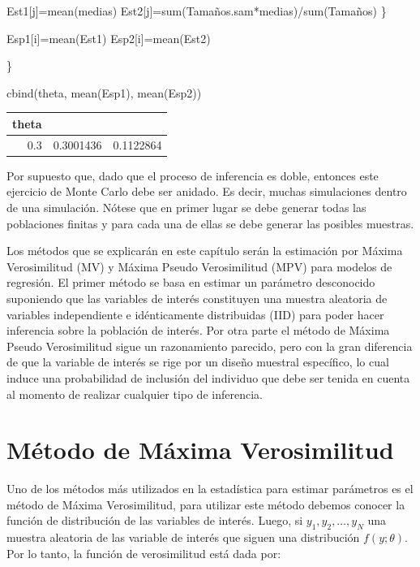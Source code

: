 \documentclass[
  12pt,
]{book}
\newenvironment{Shaded}{\begin{snugshade}}{\end{snugshade}}
\newcommand{\FunctionTok}[1]{\textcolor[rgb]{0.00,0.00,0.00}{#1}}
\newcommand{\NormalTok}[1]{#1}
\newcommand{\OtherTok}[1]{\textcolor[rgb]{0.56,0.35,0.01}{#1}}
\newcommand{\SpecialCharTok}[1]{\textcolor[rgb]{0.00,0.00,0.00}{#1}}
\begin{document}
\begin{Shaded}
\begin{Highlighting}[]
\NormalTok{Est1[j]}\OtherTok{=}\FunctionTok{mean}\NormalTok{(medias)}
\NormalTok{Est2[j]}\OtherTok{=}\FunctionTok{sum}\NormalTok{(Tamaños.sam}\SpecialCharTok{*}\NormalTok{medias)}\SpecialCharTok{/}\FunctionTok{sum}\NormalTok{(Tamaños)}
\NormalTok{\}}

\NormalTok{Esp1[i]}\OtherTok{=}\FunctionTok{mean}\NormalTok{(Est1)}
\NormalTok{Esp2[i]}\OtherTok{=}\FunctionTok{mean}\NormalTok{(Est2)}

\NormalTok{\}}

\FunctionTok{cbind}\NormalTok{(theta, }\FunctionTok{mean}\NormalTok{(Esp1), }\FunctionTok{mean}\NormalTok{(Esp2))}
\end{Highlighting}
\end{Shaded}

\begin{tabular}{r|r|r}
\hline
theta &  & \\
\hline
0.3 & 0.3001436 & 0.1122864\\
\hline
\end{tabular}

Por supuesto que, dado que el proceso de inferencia es doble, entonces este ejercicio de Monte Carlo debe ser anidado. Es decir, muchas simulaciones dentro de una simulación. Nótese que en primer lugar se debe generar todas las poblaciones finitas y para cada una de ellas se debe generar las posibles muestras.

Los métodos que se explicarán en este capítulo serán la estimación por Máxima Verosimilitud (MV) y Máxima Pseudo Verosimilitud (MPV) para modelos de regresión. El primer método se basa en estimar un parámetro desconocido suponiendo que las variables de interés constituyen una muestra aleatoria de variables independiente e idénticamente distribuidas (IID) para poder hacer inferencia sobre la población de interés. Por otra parte el método de Máxima Pseudo Verosimilitud sigue un razonamiento parecido, pero con la gran diferencia de que la variable de interés se rige por un diseño muestral específico, lo cual induce una probabilidad de inclusión del individuo que debe ser tenida en cuenta al momento de realizar cualquier tipo de inferencia.

\hypertarget{muxe9todo-de-muxe1xima-verosimilitud}{%
\section{Método de Máxima Verosimilitud}\label{muxe9todo-de-muxe1xima-verosimilitud}}

Uno de los métodos más utilizados en la estadística para estimar parámetros es el método de Máxima Verosimilitud, para utilizar este método debemos conocer la función de distribución de las variables de interés. Luego, si \(y_{1},y_{2},\ldots,y_{N}\) una muestra aleatoria de las variable de interés que siguen una distribución \(f(y;\theta)\). Por lo tanto, la función de verosimilitud está dada por:
\end{document}
